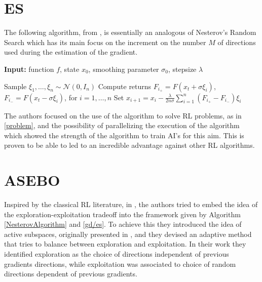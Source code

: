 
\section{ES}\label{ESAlgorithm}

The following algorithm, from \cite{Salimans2017}, is essentially an analogous of Nesterov's Random Search which has its main focus
on the increment on the number $M$ of directions used during the estimation of the gradient.

\begin{algorithm}[h]
\caption{ES algorithm}\label{gd/es}

\hspace*{\algorithmicindent} \textbf{Input:} function $f$, state $x_0$, smoothing parameter $\sigma_0$, stepsize $\lambda$
\begin{algorithmic}[1]

    \State Sample $\xi_1,\dots,\xi_n \sim \mathcal{N}(0,I_n)$
    \State Compute returns $F_{i_+} = F(x_t + \sigma\xi_i)$, $F_{i_-} = F(x_t - \sigma\xi_i)$, for $i=1,\dots,n$
    \State Set $x_{i+1} = x_i - \frac{\lambda}{2n\sigma}\sum_{i=1}^n (F_{i_+} - F_{i_-})\xi_i$
\EndFor

\end{algorithmic}
\end{algorithm}

The authors focused on the use of the algorithm to solve RL problems, as in \ref{problem}, and the possibility of parallelizing the execution of the algorithm which showed the
strength of the algorithm to train AI's for this aim. This is proven to be able to led to an incredible advantage against other RL algorithms.


\section{ASEBO}\label{sect:ASEBO}

Inspired by the classical RL literature, in \cite{Choromanski2019}, the authors tried to embed the idea of the
exploration-exploitation tradeoff into the framework given by Algorithm \ref{NesterovAlgorithm} and \ref{gd/es}. To
achieve this they introduced the idea of active subspaces, originally presented in \cite{constantine2015active}, and they devised an adaptive
method that tries to balance between exploration and exploitation. In their work they identified exploration as
the choice of directions independent of previous gradients directions, while exploitation was associated to choice of
random directions dependent of previous gradients.

